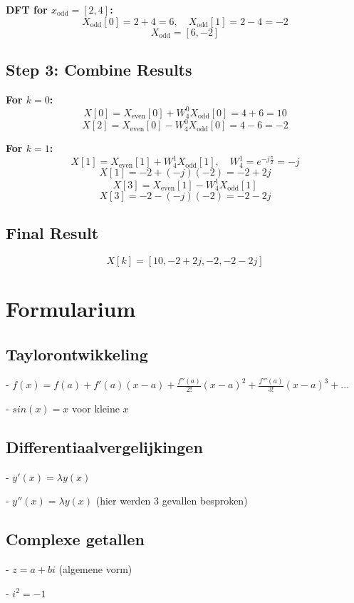 \documentclass[a4paper]{report}
\begin{document}
\textbf{DFT for \( x_{\text{odd}} = [2, 4] \):}
\[
	X_{\text{odd}}[0] = 2 + 4 = 6, \quad X_{\text{odd}}[1] = 2 - 4 = -2
\]
\[
	X_{\text{odd}} = [6, -2]
\]

\subsection*{Step 3: Combine Results}
\textbf{For \( k = 0 \):}
\[
	X[0] = X_{\text{even}}[0] + W_4^0 X_{\text{odd}}[0] = 4 + 6 = 10
\]
\[
	X[2] = X_{\text{even}}[0] - W_4^0 X_{\text{odd}}[0] = 4 - 6 = -2
\]

\textbf{For \( k = 1 \):}
\[
	X[1] = X_{\text{even}}[1] + W_4^1 X_{\text{odd}}[1], \quad W_4^1 = e^{-j\frac{\pi}{2}} = -j
\]
\[
	X[1] = -2 + (-j)(-2) = -2 + 2j
\]
\[
	X[3] = X_{\text{even}}[1] - W_4^1 X_{\text{odd}}[1]
\]
\[
	X[3] = -2 - (-j)(-2) = -2 - 2j
\]

\subsection*{Final Result}
\[
	X[k] = [10, -2 + 2j, -2, -2 - 2j]
\]




\section*{Formularium}

\subsection*{Taylorontwikkeling}

- $ f(x) = f(a) + f'(a)(x-a) + \frac{f''(a)}{2!}(x-a)^2 + \frac{f'''(a)}{3!}(x-a)^3 + ... $

- $sin(x) = x$ voor kleine $x$

\subsection*{Differentiaalvergelijkingen}

- $y'(x) = \lambda y(x)$

- $y''(x) = \lambda y(x)$ (hier werden 3 gevallen besproken)

\subsection*{Complexe getallen}

- $z = a + bi$ (algemene vorm)

- $i^2 = -1$
\end{document}
